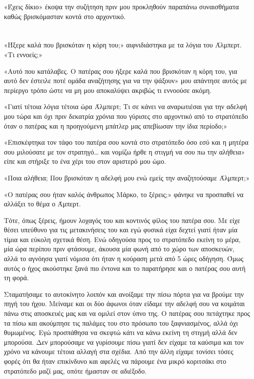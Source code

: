 \documentclass[12pt,twoside, openany]{book}
\begin{document}
«Έχεις δίκιο» έκοψα την συζήτηση πριν μου προκληθούν παραπάνω συναισθήματα καθώς βρισκόμασταν κοντά στο αρχοντικό.


\chapter{}


«Ήξερε καλά που βρισκόταν η κόρη του;» αιφνιδιάστηκα με τα λόγια του Άλμπερτ. «Τι εννοείς;»

«Αυτό που κατάλαβες. Ο πατέρας σου ήξερε καλά που βρισκόταν η κόρη του, για αυτό δεν έστειλε ποτέ ομάδα αναζήτησης για να την ψάξουν» μου απάντησε αυτός με περίεργο τρόπο ώστε να μη μου αποκαλύψει ακριβώς τι εννοούσε ακόμη.

«Γιατί τέτοια λόγια τέτοια ώρα Άλμπερτ; Τι σε κάνει να αναρωτιέσαι για την αδελφή μου τώρα και όχι πριν δεκατρία χρόνια που γύρισες στο αρχοντικό από το στρατόπεδο όταν ο πατέρας και η προηγούμενη μπάτλερ μας απεβίωσαν την ίδια περίοδο;»

«Επισκέφτηκα τον τάφο του πατέρα σου κοντά στο στρατόπεδο όσο εσύ και η μητέρα σου μιλούσατε με τον στρατηγό… και νομίζω ήρθε η στιγμή να σου πω την αλήθεια» είπε και στήριξε το ένα χέρι του στον αριστερό μου ώμο. 

«Ποια αλήθεια; Που βρισκόταν η αδελφή μου ενώ εμείς την αναζητούσαμε Άλμπερτ;»

«Ο πατέρας σου ήταν καλός άνθρωπος Μάρκο, το ξέρεις;» φάνηκε να προσπαθεί να αλλάξει το θέμα ο Άμπερτ.\newline\newline

Τότε, όπως ξέρεις, ήμουν λοχαγός του και κοντινός φίλος του πατέρα σου. Με είχε θέσει υπεύθυνο για τις μετακινήσεις του και εγώ φυσικά είχα δεχτεί γιατί ήταν μία τίμια και εύκολη σχετικά θέση. Ενώ οδηγούσα προς το στρατόπεδο εκείνη το μέρα, μία ώρα περίπου πριν φτάσουμε, άκουσα μία φωνή από το χώρο των αποσκευών, αλλά το αγνόησα γιατί νόμισα ότι ήταν η κούραση μετά από 5 ώρες οδήγηση. Όμως αυτός ο ήχος ακούστηκε ξανά πιο έντονα και το παρατήρησε και ο πατέρας σου αυτή τη φορά.

Σταματήσαμε το αυτοκίνητο λοιπόν και ανοίξαμε την πίσω πόρτα για να βρούμε την πηγή του ήχου. Μείναμε και οι δύο άφωνοι όταν είδαμε την αδελφή σου να κοιμάται πάνω στις αποσκευές μας και να ομιλεί στον ύπνο της. Ο πατέρας σου πετάχτηκε προς τα πίσω και ακούμπησε τις παλάμες του στο πρόσωπο του ξαφνιασμένος, αλλά όχι θυμωμένος. Εγώ προσπάθησα να σκεφτώ κάτι να κάνω εκείνη τη στιγμή αλλά δεν μπορούσα. Δεν μπορούσαμε να γυρίσουμε πίσω γιατί δεν είχαμε τα καύσιμα και τον χρόνο να κάνουμε τέτοια αλλαγή στα σχέδια. Από την άλλη είχαμε τονίσει τόσες φορές ότι θα ήταν επικίνδυνο και αφελές να πάρουμε ένα μικρό κοριτσάκι στο στρατόπεδο μαζί μας, οπότε ήμασταν σε αδιέξοδο.
\end{document}
